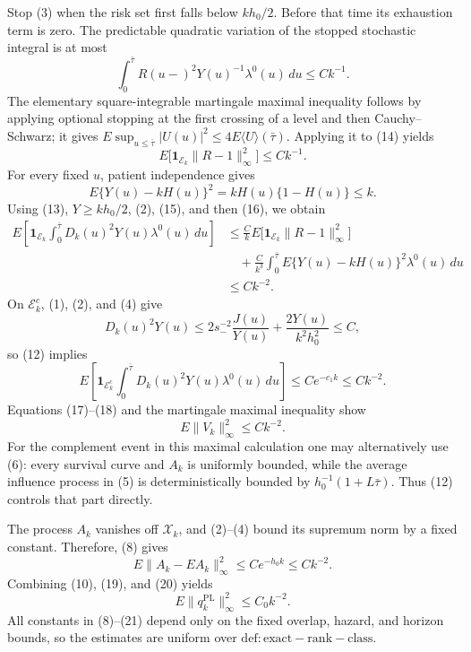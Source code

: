 Stop (3) when the risk set first falls below \(kh_0/2\).  Before that time its exhaustion term is zero.  The predictable quadratic variation of the stopped stochastic integral is at most
\[
 \int_0^{\bar\tau}R(u-)^2Y(u)^{-1}\lambda^0(u)\,du
 \le Ck^{-1}.                                                 \tag{14}
\]
The elementary square-integrable martingale maximal inequality follows by applying optional stopping at the first crossing of a level and then Cauchy--Schwarz; it gives \(E\sup_{u\le\bar\tau}|U(u)|^2\le4E\langle U\rangle(\bar\tau)\).  Applying it to (14) yields
\[
 E\bigl[\mathbf 1_{\mathcal E_k}\|R-1\|_\infty^2\bigr]
 \le Ck^{-1}.                                                 \tag{15}
\]
For every fixed \(u\), patient independence gives
\[
 E\{Y(u)-kH(u)\}^2=kH(u)\{1-H(u)\}\le k.                  \tag{16}
\]
Using (13), \(Y\ge kh_0/2\), (2), (15), and then (16), we obtain
\[
 \begin{aligned}
 E\left[\mathbf 1_{\mathcal E_k}
   \int_0^{\bar\tau}D_k(u)^2Y(u)\lambda^0(u)\,du\right]
 &\le \frac{C}{k}E\bigl[\mathbf 1_{\mathcal E_k}\|R-1\|_\infty^2\bigr]\\
 &\quad+\frac{C}{k^3}\int_0^{\bar\tau}
       E\{Y(u)-kH(u)\}^2\lambda^0(u)\,du\\
 &\le Ck^{-2}.                                                
 \end{aligned}                                                 \tag{17}
\]
On \(\mathcal E_k^c\), (1), (2), and (4) give
\[
 D_k(u)^2Y(u)
 \le 2s_-^{-2}\frac{J(u)}{Y(u)}+\frac{2Y(u)}{k^2h_0^2}
 \le C,
\]
so (12) implies
\[
 E\left[\mathbf 1_{\mathcal E_k^c}
   \int_0^{\bar\tau}D_k(u)^2Y(u)\lambda^0(u)\,du\right]
 \le Ce^{-c_1k}\le Ck^{-2}.                                 \tag{18}
\]
Equations (17)--(18) and the martingale maximal inequality show
\[
 E\|V_k\|_\infty^2\le Ck^{-2}.                              \tag{19}
\]
For the complement event in this maximal calculation one may alternatively use (6): every survival curve and \(A_k\) is uniformly bounded, while the average influence process in (5) is deterministically bounded by \(h_0^{-1}(1+L\bar\tau)\).  Thus (12) controls that part directly.

The process \(A_k\) vanishes off \(\mathcal X_k\), and (2)--(4) bound its supremum norm by a fixed constant.  Therefore, (8) gives
\[
 E\|A_k-EA_k\|_\infty^2\le Ce^{-h_0k}\le Ck^{-2}.           \tag{20}
\]
Combining (10), (19), and (20) yields
\[
 E\|q_k^{\mathrm{PL}}\|_\infty^2\le C_0k^{-2}.             \tag{21}
\]
All constants in (8)--(21) depend only on the fixed overlap, hazard, and horizon bounds, so the estimates are uniform over \(\mathrm{def:exact-rank-class}\).

